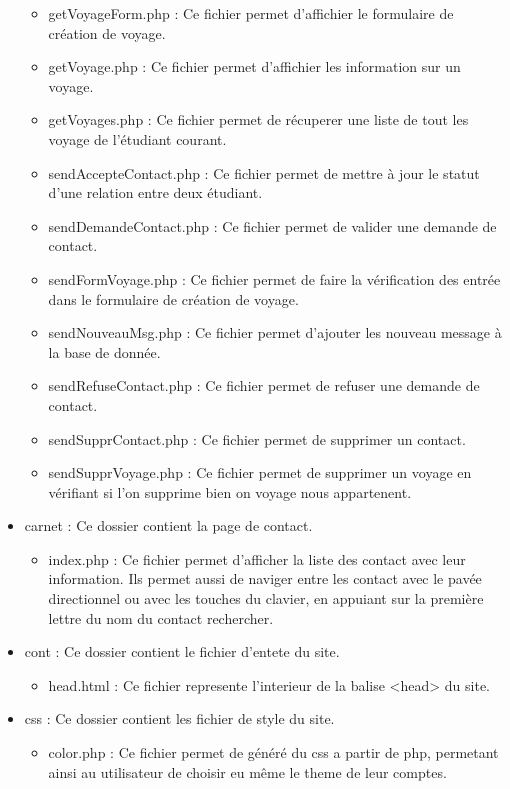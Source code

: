 \documentclass[a4paper,10pt]{report}
\begin{document}
\begin{itemize}
\begin{itemize}
         \item getVoyageForm.php : Ce fichier permet d'affichier le formulaire de création de voyage.
         \item getVoyage.php : Ce fichier permet d'affichier les information sur un voyage.
         \item getVoyages.php : Ce fichier permet de récuperer une liste de tout les voyage de l'étudiant courant.
         \item sendAccepteContact.php : Ce fichier permet de mettre à jour le statut d'une relation entre deux étudiant.
         \item sendDemandeContact.php : Ce fichier permet de valider une demande de contact.
         \item sendFormVoyage.php : Ce fichier permet de faire la vérification des entrée dans le formulaire de création de voyage.
         \item sendNouveauMsg.php : Ce fichier permet d'ajouter les nouveau message à la base de donnée.
         \item sendRefuseContact.php : Ce fichier permet de refuser une demande de contact.
         \item sendSupprContact.php : Ce fichier permet de supprimer un contact.
         \item sendSupprVoyage.php : Ce fichier permet de supprimer un voyage en vérifiant si l'on supprime bien on voyage nous appartenent.
    \end{itemize}
    \item carnet : Ce dossier contient la page de contact.
    \begin{itemize}
        \item index.php : Ce fichier permet d'afficher la liste des contact avec leur information. Ils permet aussi de naviger entre les contact avec le pavée directionnel ou avec les
        touches du clavier, en appuiant sur la première lettre du nom du contact rechercher.
    \end{itemize}
    \item cont : Ce dossier contient le fichier d'entete du site.
    \begin{itemize}
        \item head.html : Ce fichier represente l'interieur de la balise <head> du site. 
    \end{itemize}
    \item css : Ce dossier contient les fichier de style du site.
    \begin{itemize}
        \item color.php : Ce fichier permet de généré du css a partir de php, permetant ainsi au utilisateur de choisir eu même le theme de leur comptes.

\end{itemize}
\end{itemize}
\end{document}
